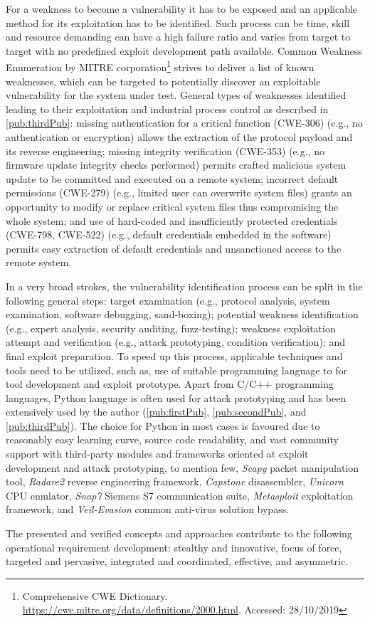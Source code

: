 For a weakness to become a vulnerability it has to be exposed and an applicable method for its exploitation has to be identified. Such process can be time, skill and resource demanding can have a high failure ratio and varies from target to target with no predefined exploit development path available. Common Weakness Enumeration by MITRE corporation\footnote{Comprehensive CWE Dictionary. \url{https://cwe.mitre.org/data/definitions/2000.html}. Accessed: 28/10/2019} strives to deliver a list of known weaknesses, which can be targeted to potentially discover an exploitable vulnerability for the system under test.
General types of weaknesses identified leading to their exploitation and industrial process control as described in \ref{pub:thirdPub}:
missing authentication for a critical function (CWE-306) (e.g., no authentication or encryption) allows the extraction of the protocol payload and its reverse engineering;
missing integrity verification (CWE-353) (e.g., no firmware update integrity checks performed) permits crafted malicious system update to be committed and executed on a remote system;
incorrect default permissions (CWE-279) (e.g., limited user can overwrite system files) grants an opportunity to modify or replace critical system files thus compromising the whole system; and
use of hard-coded and insufficiently protected credentials (CWE-798, CWE-522) (e.g., default credentials embedded in the software) permits easy extraction of default credentials and unsanctioned access to the remote system.

In a very broad strokes, the vulnerability identification process can be split in the following general steps: target examination (e.g., protocol analysis, system examination, software debugging, sand-boxing); potential weakness identification (e.g., expert analysis, security auditing, fuzz-testing); weakness exploitation attempt and verification (e.g., attack prototyping, condition verification); and final exploit preparation. 
To speed up this process, applicable techniques and tools need to be utilized, such as, use of suitable programming language to for tool development and exploit prototype.
Apart from C/C++ programming languages, Python language is often used for attack prototyping and has been extensively used by the author (\ref{pub:firstPub}, \ref{pub:secondPub}, and \ref{pub:thirdPub}). The choice for Python in most cases is favoured due to reasonably easy learning curve, source code readability, and vast community support with third-party modules and frameworks oriented at exploit development and attack prototyping, to mention few, \textit{Scapy} packet manipulation tool, \textit{Radare2} reverse engineering framework, \textit{Capstone} disassembler, \textit{Unicorn} CPU emulator, \textit{Snap7} Siemens S7 communication suite, \textit{Metasploit} exploitation framework, and \textit{Veil-Evasion} common anti-virus solution bypass.

The presented and verified concepts and approaches contribute to the following operational requirement development:
stealthy and innovative,
focus of force,
targeted and pervasive,
integrated and coordinated,
effective, and
asymmetric.
